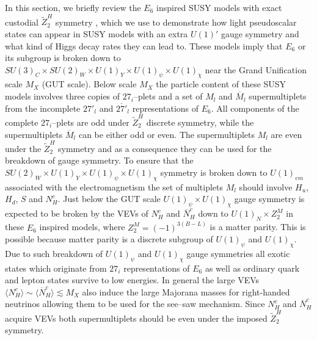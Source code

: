 \documentclass[12pt,a4paper]{article}
\begin{document}
In this section, we briefly review the $E_6$ inspired SUSY models with
exact custodial $\tilde{Z}^{H}_2$ symmetry \cite{nevzorov}, which we
use to demonstrate how light pseudoscalar states can appear in SUSY
models with an extra $U(1)'$ gauge symmetry and what kind of Higgs
decay rates they can lead to.  These models imply that $E_6$ or its
subgroup is broken down to $SU(3)_C\times SU(2)_W\times U(1)_Y\times
U(1)_{\psi}\times U(1)_{\chi}$ near the Grand Unification scale $M_X$
(GUT scale). Below scale $M_X$ the particle content of these SUSY
models involves three copies of $27_i$--plets and a set of $M_{l}$ and
$\overline{M}_l$ supermultiplets from the incomplete $27'_l$ and
$\overline{27'}_l$ representations of $E_6$. All components of the
complete $27_i$--plets are odd under $\tilde{Z}^{H}_2$ discrete
symmetry, while the supermultiplets $\overline{M}_l$ can be either odd
or even. The supermultiplets $M_{l}$ are even under the
$\tilde{Z}^{H}_2$ symmetry and as a consequence they can be used for
the breakdown of gauge symmetry. To ensure that the $SU(2)_W\times
U(1)_Y\times U(1)_{\psi}\times U(1)_{\chi}$ symmetry is broken down to
$U(1)_{em}$ associated with the electromagnetism the set of multiplets
$M_{l}$ should involve $H_u$, $H_d$, $S$ and $N^c_H$.  Just below the
GUT scale $U(1)_{\psi}\times U(1)_{\chi}$ gauge symmetry is expected
to be broken by the VEVs of $N^c_H$ and $\overline{N}_H^c$ down to
$U(1)_{N}\times Z_{2}^{M}$ in these $E_6$ inspired models, where
$Z_{2}^{M}=(-1)^{3(B-L)}$ is a matter parity. This is possible because
matter parity is a discrete subgroup of $U(1)_{\psi}$ and
$U(1)_{\chi}$. Due to such breakdown of $U(1)_{\psi}$ and
$U(1)_{\chi}$ gauge symmetries all exotic states which originate from
$27_i$ representations of $E_6$ as well as ordinary quark and lepton
states survive to low energies. In general the large VEVs $\langle
N^c_H \rangle \sim \langle \overline{N}_H^c \rangle \lesssim M_X$ also
induce the large Majorana masses for right-handed neutrinos allowing
them to be used for the see--saw mechanism.  Since $N^c_H$ and
$\overline{N}_H^c$ acquire VEVs both supermultiplets should be even
under the imposed $\tilde{Z}^{H}_2$ symmetry.
\end{document}
